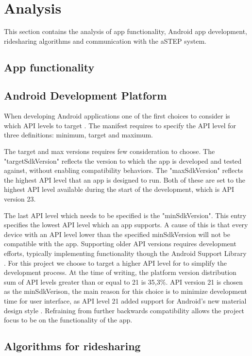 \section{Analysis}
This section contains the analysis of app functionality, Android app development, ridesharing algorithms and communication with the aSTEP system.

\subsection{App functionality}




\subsection{Android Development Platform}
When developing Android applications one of the first choices to consider is which API levels to target \cite{usesSDK}.
The manifest requires to specify the API level for three definitions: minimum, target and maximum. 

The target and max versions requires few consideration to choose.
The "targetSdkVersion" reflects the version to which the app is developed and tested against, without enabling compatibility behaviors.
The "maxSdkVersion" reflects the highest API level that an app is designed to run.
Both of these are set to the highest API level available during the start of the development, which is API version 23.

The last API level which needs to be specified is the "minSdkVersion".
This entry specifies the lowest API level which an app supports.
A cause of this is that every device with an API level lower than the specified minSdkVersion will not be compatible with the app.
Supporting older API versions requires development efforts, typically implementing functionality though the Android Support Library \cite{androidSL}.
For this project we choose to target a higher API level for to simplify the development process.
At the time of writing, the platform version distribution sum of API levels greater than or equal to 21 is 35,3\%.
API version 21 is chosen as the minSdkVerison, the main reason for this choice is to minimize development time for user interface, as API level 21 added support for Android's new material design style \cite{android5API}. Refraining from further backwards compatibility allows the project focus to be on the functionality of the app. 

\subsection{Algorithms for ridesharing}




